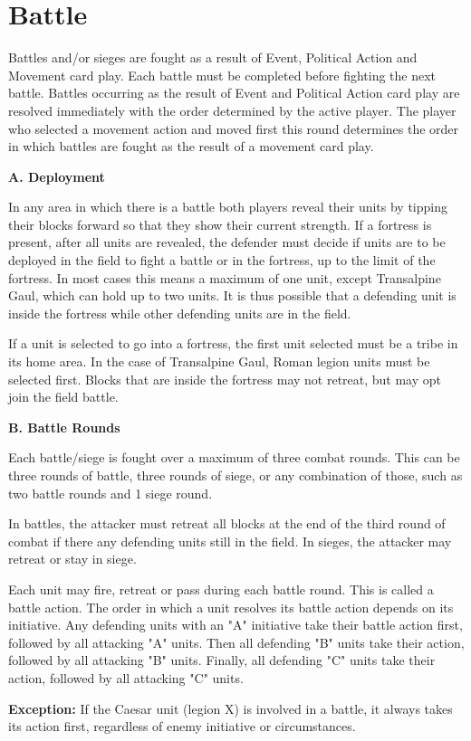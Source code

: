 \section{Battle}
\par
Battles and/or sieges are fought as a result of Event, Political Action and Movement card play. Each battle must be completed before fighting the next battle. Battles occurring as the result of Event and Political Action card play are resolved immediately with the order determined by the active player. The player who selected a movement action and moved first this round determines the order in which battles are fought as the result of a movement card play.

\textbf{A. Deployment}
\par
In any area in which there is a battle both players reveal their units by tipping their blocks forward so that they show their current strength. If a fortress is present, after all units are revealed, the defender must decide if units are to be deployed in the field to fight a battle or in the fortress, up to the limit of the fortress. In most cases this means a maximum of one unit, except Transalpine Gaul, which can hold up to two units. It is thus possible that a defending unit is inside the fortress while other defending units are in the field.

If a unit is selected to go into a fortress, the first unit selected must be a tribe in its home area. In the case of Transalpine Gaul, Roman legion units must be selected first. Blocks that are inside the fortress may not retreat, but may opt join the field battle.

\textbf{B. Battle Rounds}
\par
Each battle/siege is fought over a maximum of three combat rounds. This can be three rounds of battle, three rounds of siege, or any combination of those, such as two battle rounds and 1 siege round.

In battles, the attacker must retreat all blocks at the end of the third round of combat if there any defending units still in the field. In sieges, the attacker may retreat or stay in siege.

Each unit may fire, retreat or pass during each battle round. This is called a battle action. The order in which a unit resolves its battle action depends on its initiative. Any defending units with an "A" initiative take their battle action first, followed by all attacking "A" units. Then all defending "B" units take their action, followed by all attacking "B" units. Finally, all defending "C" units take their action, followed by all attacking "C" units.

\textbf{Exception:} If the Caesar unit (legion X) is involved in a battle, it always takes its action first, regardless of enemy initiative or circumstances.
